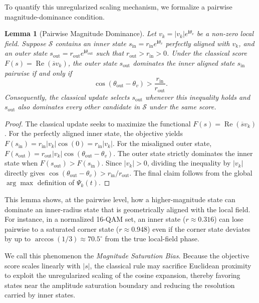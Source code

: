 \documentclass[10pt,journal,letterpaper]{IEEEtran}
\newtheorem{lemma}{Lemma}
\begin{document}
To quantify this unregularized scaling mechanism, we formalize a pairwise
magnitude-dominance condition.

\begin{lemma}[Pairwise Magnitude Dominance]
\label{lem:centrifugal_drift}
Let $v_k = |v_k|e^{\mathbf{i}\theta_v}$ be a non-zero local field. Suppose $\mathcal{S}$ contains an inner state $s_{\mathrm{in}} = r_{\mathrm{in}}e^{\mathbf{i}\theta_v}$ perfectly aligned with $v_k$, and an outer state $s_{\mathrm{out}} = r_{\mathrm{out}}e^{\mathbf{i}\theta_{\mathrm{out}}}$ such that $r_{\mathrm{out}} > r_{\mathrm{in}}>0$. Under the classical score $F(s)=\operatorname{Re}(\overline{s}v_k)$, the outer state $s_{\mathrm{out}}$ dominates the inner aligned state $s_{\mathrm{in}}$ pairwise if and only if
\begin{equation}
    \cos(\theta_{\mathrm{out}} - \theta_v) > \frac{r_{\mathrm{in}}}{r_{\mathrm{out}}}.
\end{equation}
Consequently, the classical update selects $s_{\mathrm{out}}$ whenever this
inequality holds and $s_{\mathrm{out}}$ also dominates every other candidate in
$\mathcal{S}$ under the same score.
\end{lemma}

\begin{proof}
The classical update seeks to maximize the functional $F(s) = \operatorname{Re}(\overline{s}v_k)$. For the perfectly aligned inner state, the objective yields $F(s_{\mathrm{in}}) = r_{\mathrm{in}}|v_k|\cos(0) = r_{\mathrm{in}}|v_k|$. For the misaligned outer state, $F(s_{\mathrm{out}}) = r_{\mathrm{out}}|v_k|\cos(\theta_{\mathrm{out}} - \theta_v)$. The outer state strictly dominates the inner state when $F(s_{\mathrm{out}}) > F(s_{\mathrm{in}})$. Since $|v_k| > 0$, dividing the inequality by $|v_k|$ directly gives $\cos(\theta_{\mathrm{out}} - \theta_v) > r_{\mathrm{in}} / r_{\mathrm{out}}$. The final claim follows from the global $\arg\max$ definition of $\Psi_k(t)$.
\end{proof}

This lemma shows, at the pairwise level, how a higher-magnitude state can
dominate an inner-radius state that is geometrically aligned with the local
field. For instance, in a normalized 16-QAM set, an inner state
($r \approx 0.316$) can lose pairwise to a saturated corner state
($r \approx 0.948$) even if the corner state deviates by up to
$\arccos(1/3) \approx 70.5^\circ$ from the true local-field phase.

We call this phenomenon the \textit{Magnitude Saturation Bias}. Because the
objective score scales linearly with $|s|$, the classical rule may sacrifice
Euclidean proximity to exploit the unregularized scaling of the cosine
expansion, thereby favoring states near the amplitude saturation boundary and
reducing the resolution carried by inner states.
\end{document}
